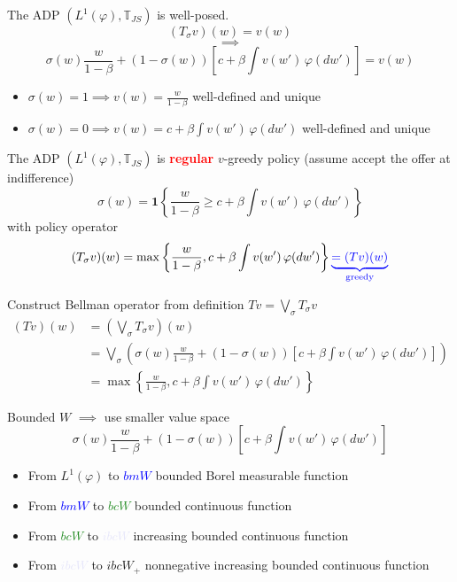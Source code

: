 \documentclass[aspectratio=169]{beamer} %
\begin{document}
\begin{frame}{The ADP $(L^1(\varphi),\mathbb{T}_{JS})$ is well-posed.}
 $$
 (T_\sigma v)(w) = v(w) 
 $$
 $$
\implies
 $$
    $$
\sigma(w) \frac{w}{1-\beta} + (1-\sigma(w))\left[c+\beta\int v(w')\, \varphi(dw')\right] = v(w)
$$

\begin{itemize}
    \item $\sigma(w) = 1 \implies v(w) = \frac{w}{1-\beta} $ well-defined and unique
    \item $\sigma(w) = 0\implies v(w) = c+\beta\int v(w') \, \varphi(dw')$ well-defined and unique
\end{itemize}

\end{frame}

\begin{frame}{The ADP $(L^1(\varphi),\mathbb{T}_{JS})$ is \textcolor{red}{\textbf{regular}}}
$v$-greedy policy (assume accept the offer at indifference)
    $$
    \sigma (w) = \mathbf{1}\left\{\frac{w}{1-\beta}\ge c+\beta\int v(w') \, \varphi(dw') \right\}
    $$
    with policy operator
    $$
    (T_\sigma v)(w) = \max\left\{\frac{w}{1-\beta}, c+\beta\int v(w') \, \varphi(dw')\right\} \textcolor{blue}{\underbrace{= (Tv)(w)}_{\text{greedy}}}
    $$
\end{frame}

\begin{frame}{Construct Bellman operator from definition}
    $Tv = \bigvee_\sigma T_\sigma v$
    \begin{align*}
        (Tv)(w) &= \left(\bigvee_\sigma T_\sigma v\right)(w)\\
        &= \bigvee_\sigma \left(\sigma(w) \frac{w}{1-\beta} + (1-\sigma(w))\left[c+\beta\int v(w')\, \varphi(dw')\right]\right)\\
        &= \max\left\{\frac{w}{1-\beta}, c+\beta\int v(w') \, \varphi(dw')\right\}
    \end{align*}
    
\end{frame}

\begin{frame}{Bounded $W$ $\implies$ use smaller value space}
$$
\sigma(w) \frac{w}{1-\beta} + (1-\sigma(w))\left[c+\beta\int v(w')\, \varphi(dw')\right]
$$
\begin{itemize}
    \item From $L^1(\varphi)$ to \textcolor{blue}{$bmW$} bounded Borel measurable function
    \item From \textcolor{blue}{$bmW$} to \textcolor{ForestGreen}{$bcW$} bounded continuous function
    \item From \textcolor{ForestGreen}{$bcW$} to \textcolor{Lavender}{$ibcW$} increasing bounded continuous function
    \item From \textcolor{Lavender}{$ibcW$} to \textcolor{RedOrange}{$ibcW_+$} nonnegative increasing bounded continuous function
\end{itemize}
\end{frame}
\end{document}
